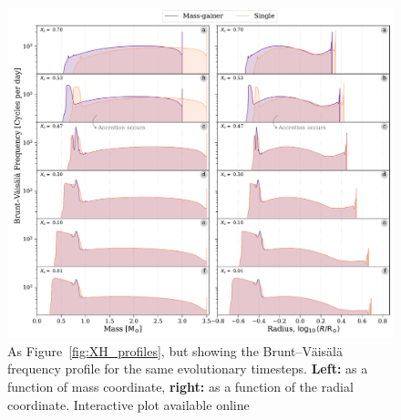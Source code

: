 \documentclass[twocolumn, twocolappendix, oneside]{aastex631}
\newcommand{\bvf}{Brunt–Väisälä frequency\xspace}
\begin{document}
\begin{figure}
    \centering
    \includegraphics[width=\textwidth]{figures/BV_profile_all_combo.pdf}
    \caption{As Figure~\ref{fig:XH_profiles}, but showing the \bvf profile for the same evolutionary timesteps. \textbf{Left:} as a function of mass coordinate, \textbf{right:} as a function of the radial coordinate. Interactive plot available online \href{www.tomwagg.com/html/interact/mass-gainer-asteroseismology.html\#fig2-4}{{\color{SeaGreen}\faChartArea}}}
    \label{fig:BV_profiles}
\end{figure}
\end{document}
